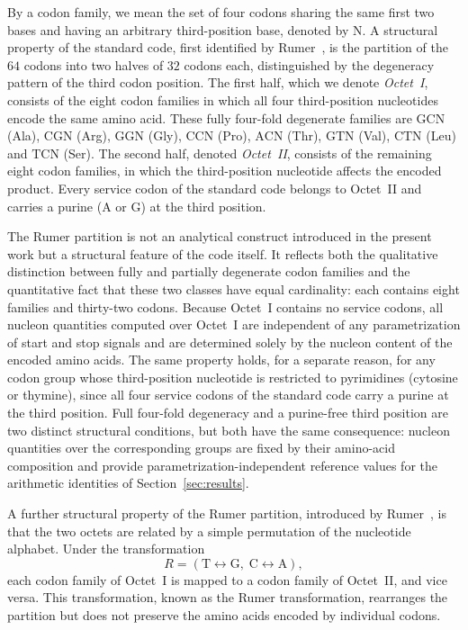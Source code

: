 \documentclass[11pt,a4paper]{article}
\renewcommand{\_}{\origunderscore\allowbreak}
\begin{document}
By a codon family, we mean the set of four codons sharing the same
first two bases and having an arbitrary third-position base, denoted
by $\mathrm{N}$. A structural property of the standard code, first
identified by Rumer~\cite{rumer1966,rumer1968}, is the partition of
the $64$ codons into two halves of $32$ codons each, distinguished
by the degeneracy pattern of the third codon position. The first
half, which we denote \emph{Octet~I}, consists of the eight codon
families in which all four third-position nucleotides encode the
same amino acid. These fully four-fold degenerate families are
$\mathrm{GCN}$ (Ala), $\mathrm{CGN}$ (Arg), $\mathrm{GGN}$ (Gly),
$\mathrm{CCN}$ (Pro), $\mathrm{ACN}$ (Thr), $\mathrm{GTN}$ (Val),
$\mathrm{CTN}$ (Leu) and $\mathrm{TCN}$ (Ser). The second half,
denoted \emph{Octet~II}, consists of the remaining eight codon
families, in which the third-position nucleotide affects the encoded
product. Every service codon of the standard code belongs to
Octet~II and carries a purine ($\mathrm{A}$ or $\mathrm{G}$) at the
third position.

The Rumer partition is not an analytical construct introduced in the
present work but a structural feature of the code itself. It reflects
both the qualitative distinction between fully and partially
degenerate codon families and the quantitative fact that these two
classes have equal cardinality: each contains eight families and
thirty-two codons. Because Octet~I contains no service codons, all
nucleon quantities computed over Octet~I are independent of any
parametrization of start and stop signals and are determined solely by
the nucleon content of the encoded amino acids. The same property
holds, for a separate reason, for any codon group whose third-position
nucleotide is restricted to pyrimidines (cytosine or thymine), since
all four service codons of the standard code carry a purine at the
third position. Full four-fold degeneracy and a purine-free third
position are two distinct structural conditions, but both have the
same consequence: nucleon quantities over the corresponding groups
are fixed by their amino-acid composition and provide
parametrization-independent reference values for the arithmetic
identities of Section~\ref{sec:results}.

A further structural property of the Rumer partition, introduced by
Rumer~\cite{rumer1968}, is that the two octets are related by a simple
permutation of the nucleotide alphabet. Under the transformation
\[
R =
(\mathrm{T} \leftrightarrow \mathrm{G},\;
 \mathrm{C} \leftrightarrow \mathrm{A}),
\]
each codon family of Octet~I is mapped to a codon family of Octet~II,
and vice versa. This transformation, known as the Rumer
transformation, rearranges the partition but does not preserve the
amino acids encoded by individual codons.
\end{document}
